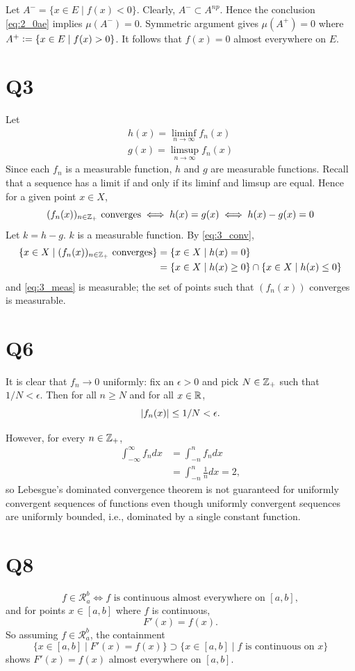 \documentclass[12pt]{article}
\begin{document}
Let $A^{-} = \{x \in E \mid f(x) < 0\}$. 
Clearly, $A^{-} \subset A^{np}$. 
Hence the conclusion \eqref{eq:2_0ae} implies $\mu(A^{-}) = 0$. 
Symmetric argument gives $\mu(A^{+}) = 0$ where $A^{+} \vcentcolon= \{x \in E \mid f(x) > 0\}$. 
It follows that $f(x) = 0$ almost everywhere on $E$. 


\section*{Q3} 
Let 
\begin{gather*}
  h(x) = \liminf_{n \rightarrow \infty} f_n(x) \\ 
  g(x) = \limsup_{n \rightarrow \infty} f_n(x)
\end{gather*}
Since each $f_n$ is a measurable function, $h$ and $g$ are measurable functions. 
Recall that a sequence has a limit if and only if its liminf and limsup are equal. 
Hence for a given point $x \in X$,
\begin{equation} \label{eq:3_conv} 
  (f_n(x))_{n \in \mathbb{Z}_{+}} \text{ converges} \iff h(x) = g(x) \iff h(x) - g(x) = 0 
\end{equation} 
Let $k = h - g$. 
$k$ is a measurable function. 
By \eqref{eq:3_conv}, 
\begin{align}
  \{x \in X \mid (f_n(x))_{n \in \mathbb{Z}_{+}} \text{ converges}\} 
  & = \{x \in X \mid h(x) = 0\} \nonumber \nonumber \\ 
  & = \{x \in X \mid h(x) \geq 0\} \cap \{x \in X \mid h(x) \leq 0\} \label{eq:3_meas}
\end{align}
and \eqref{eq:3_meas} is measurable;
the set of points such that $(f_n(x))$ converges is measurable. 

\section*{Q6} 
It is clear that $f_n \rightarrow 0$ uniformly: 
fix an $\epsilon > 0$ and pick $N \in \mathbb{Z}_{+}$ such that $1 / N < \epsilon$. 
Then for all $n \geq N$ and for all $x \in \mathbb{R}$, 
$$\left|f_n(x)\right| \leq 1 / N < \epsilon.$$ 

However, for every $n \in \mathbb{Z}_{+}$, 
\begin{align*}
  \int_{-\infty}^{\infty} f_n dx  
  & = \int_{-n}^{n} f_n dx \\ 
  & = \int_{-n}^{n} \frac{1}{n} dx = 2,
\end{align*}
so Lebesgue's dominated convergence theorem is not guaranteed for uniformly convergent sequences of functions even though uniformly convergent sequences are uniformly bounded, i.e., dominated by a single constant function. 

\section*{Q8} 
$$f \in \mathscr{R}_{a}^{b} \iff f \text{ is continuous almost everywhere on } [a, b],$$
and for points $x \in [a, b]$ where $f$ is continuous, 
$$F'(x) = f(x).$$
So assuming $f \in \mathscr{R}_{a}^{b}$, the containment
$$\{x \in [a, b] \mid F'(x) = f(x)\} \supset \{x \in [a, b] \mid f \text{ is continuous on } x\}$$
shows $F'(x) = f(x)$ almost everywhere on $[a, b]$. 
\end{document}
